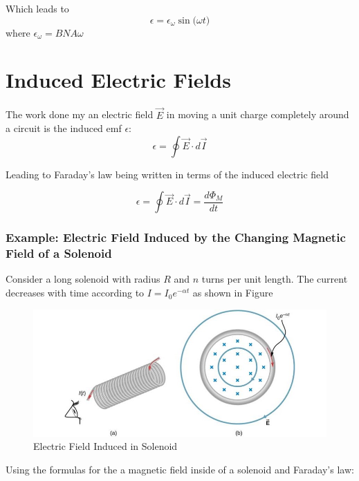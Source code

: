 \documentclass[14pt]{memoir}
\begin{document}
Which leads to 
\begin{equation}
\epsilon = \epsilon_\omega \sin{(\omega t})
\end{equation}
where $\epsilon_\omega = B N A \omega$

\section{Induced Electric Fields}

The work done my an electric field $\vec{E}$ in moving a unit charge completely around a circuit is the induced emf $\epsilon$:
\begin{equation}
\epsilon = \oint \vec{E} \cdot d \vec{I}
\end{equation}

Leading to Faraday's law being written in terms of the induced electric field

\begin{equation}
\epsilon = \oint \vec{E} \cdot d \vec{I} = \frac{d \Phi_M}{dt}
\end{equation}

\subsubsection{Example: Electric Field Induced by the Changing Magnetic Field of a Solenoid}

Consider a long solenoid with radius $R$ and $n$ turns per unit length. The current decreases with time according to $I = I_0 e^{-\alpha t}$ as shown in Figure 


\begin{figure}[H]
\begin{center}
\includegraphics[scale=0.5]{fig/fig_13_18.jpg}
\caption{Electric Field Induced in Solenoid}
\label{fig:13_18}
\end{center}
\end{figure}

Using the formulas for the  a magnetic field inside of a solenoid and Faraday's law:
\end{document}
